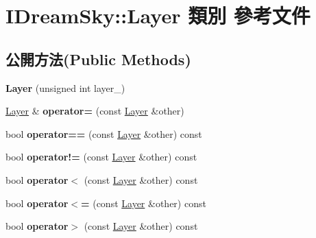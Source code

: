 \hypertarget{class_i_dream_sky_1_1_layer}{}\section{I\+Dream\+Sky\+:\+:Layer 類別 參考文件}
\label{class_i_dream_sky_1_1_layer}
\subsection*{公開方法(Public Methods)}
\begin{DoxyCompactItemize}
\item 
{\bfseries Layer} (unsigned int layer\+\_\+)\hypertarget{class_i_dream_sky_1_1_layer_a9536e86d2c19f61711a7b743290cb090}{}\label{class_i_dream_sky_1_1_layer_a9536e86d2c19f61711a7b743290cb090}

\item 
\hyperlink{class_i_dream_sky_1_1_layer}{Layer} \& {\bfseries operator=} (const \hyperlink{class_i_dream_sky_1_1_layer}{Layer} \&other)\hypertarget{class_i_dream_sky_1_1_layer_a87d3ea2ca016510f11f604ecbb1a5fb2}{}\label{class_i_dream_sky_1_1_layer_a87d3ea2ca016510f11f604ecbb1a5fb2}

\item 
bool {\bfseries operator==} (const \hyperlink{class_i_dream_sky_1_1_layer}{Layer} \&other) const \hypertarget{class_i_dream_sky_1_1_layer_a8e92c4050c65f0716056ead2596b267a}{}\label{class_i_dream_sky_1_1_layer_a8e92c4050c65f0716056ead2596b267a}

\item 
bool {\bfseries operator!=} (const \hyperlink{class_i_dream_sky_1_1_layer}{Layer} \&other) const \hypertarget{class_i_dream_sky_1_1_layer_a291ed0962dcbfc3d9bb61a7f73032afd}{}\label{class_i_dream_sky_1_1_layer_a291ed0962dcbfc3d9bb61a7f73032afd}

\item 
bool {\bfseries operator$<$} (const \hyperlink{class_i_dream_sky_1_1_layer}{Layer} \&other) const \hypertarget{class_i_dream_sky_1_1_layer_a852fd88c0dc690b456c9c48e4dfa9de5}{}\label{class_i_dream_sky_1_1_layer_a852fd88c0dc690b456c9c48e4dfa9de5}

\item 
bool {\bfseries operator$<$=} (const \hyperlink{class_i_dream_sky_1_1_layer}{Layer} \&other) const \hypertarget{class_i_dream_sky_1_1_layer_a6f28ee4c27eb68b5d2b8f91b8af15499}{}\label{class_i_dream_sky_1_1_layer_a6f28ee4c27eb68b5d2b8f91b8af15499}

\item 
bool {\bfseries operator$>$} (const \hyperlink{class_i_dream_sky_1_1_layer}{Layer} \&other) const \hypertarget{class_i_dream_sky_1_1_layer_aeb9925ef7a43eee5e0477a9596946a26}{}\label{class_i_dream_sky_1_1_layer_aeb9925ef7a43eee5e0477a9596946a26}


\end{DoxyCompactItemize}
